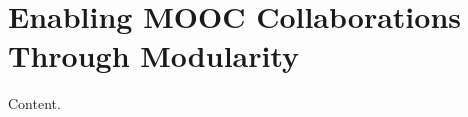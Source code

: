 

\def\thetitle{Enabling MOOC Collaborations Through Modularity}
\def\shorttitle{Modular MOOCs}
\def\theauthors{Geoffrey Challen}
\def\shortauthors{Challen}
\def\submissiondate{\today}
\def\whitepapername{Learning with MOOCs}


\pagestyle{whitepaper}
\thispagestyle{emptywhitepaper}

\chapter{\thetitle}

Content.


